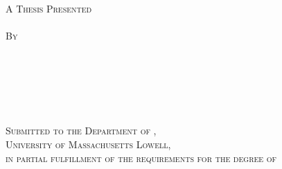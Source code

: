 
\begin{center}
		\hfill \\
		\hfill \\
		\hfill \\
\textsc{\large{
		{\thesistitle}} \\
		\hfill \\
        A Thesis Presented \\
        \hfill \\
		By \\
		\hfill \\
		\large{\thesisauthor} \\
		\hfill \\
		\hfill \\
		\hfill \\
		\hfill \\
		Submitted to the Department of {\thesisdept}, \\
        University of Massachusetts Lowell, \\
		in partial fulfillment of the requirements for the degree of}
		\hfill \\
		\hfill \\
		\hfill \\
		\hfill \\
        \MakeUppercase{\thesisdegree} \\
        \hfill \\
        \thesismonth{} \thesisyear{} \\
        \hfill \\
        \hfill \\
        \hfill \\
        \hfill \\
        \hfill \\
        \hfill \\
        \hfill \\
        \hfill \\
        \mbox{\thesisdegreeprogram{}} \\
        \hfill \\
\end{center}